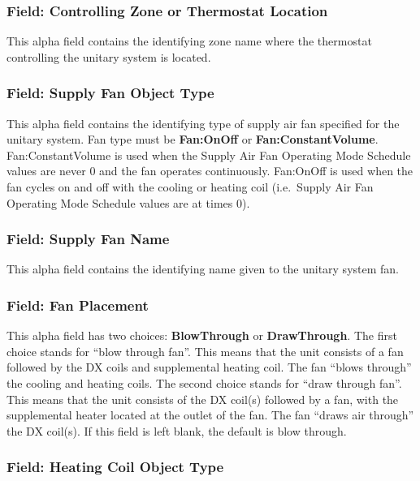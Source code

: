 \subsubsection{Field: Controlling Zone or Thermostat Location}\label{field-controlling-zone-or-thermostat-location-2}

This alpha field contains the identifying zone name where the thermostat controlling the unitary system is located.

\subsubsection{Field: Supply Fan Object Type}\label{field-supply-fan-object-type-2}

This alpha field contains the identifying type of supply air fan specified for the unitary system. Fan type must be \textbf{Fan:OnOff} or \textbf{Fan:ConstantVolume}. Fan:ConstantVolume is used when the Supply Air Fan Operating Mode Schedule values are never 0 and the fan operates continuously. Fan:OnOff is used when the fan cycles on and off with the cooling or heating coil (i.e.~Supply Air Fan Operating Mode Schedule values are at times 0).

\subsubsection{Field: Supply Fan Name}\label{field-supply-fan-name-2}

This alpha field contains the identifying name given to the unitary system fan.

\subsubsection{Field: Fan Placement}\label{field-fan-placement-2}

This alpha field has two choices: \textbf{BlowThrough} or \textbf{DrawThrough}. The first choice stands for ``blow through fan''. This means that the unit consists of a fan followed by the DX coils and supplemental heating coil. The fan ``blows through'' the cooling and heating coils. The second choice stands for ``draw through fan''. This means that the unit consists of the DX coil(s) followed by a fan, with the supplemental heater located at the outlet of the fan. The fan ``draws air through'' the DX coil(s). If this field is left blank, the default is blow through.

\subsubsection{Field: Heating Coil Object Type}\label{field-heating-coil-object-type-2}

